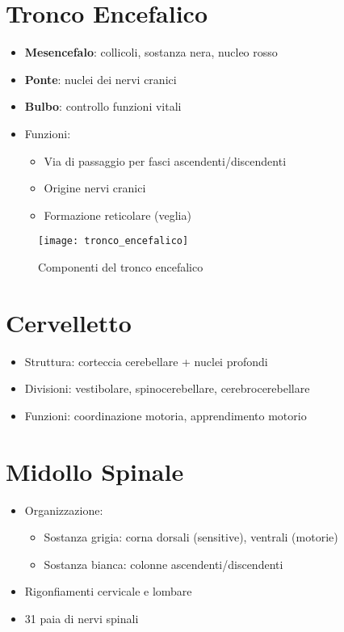 \documentclass[12pt]{article}
\begin{document}
\section{Tronco Encefalico}
\begin{itemize}
    \item \textbf{Mesencefalo}: collicoli, sostanza nera, nucleo rosso
    \item \textbf{Ponte}: nuclei dei nervi cranici
    \item \textbf{Bulbo}: controllo funzioni vitali
    \item Funzioni: 
    \begin{itemize}
        \item Via di passaggio per fasci ascendenti/discendenti
        \item Origine nervi cranici
        \item Formazione reticolare (veglia)
    \end{itemize}
\end{itemize}

\begin{figure}[h]
    \centering
    \texttt{[image: tronco\_encefalico]}
    \caption{Componenti del tronco encefalico}
\end{figure}

\section{Cervelletto}
\begin{itemize}
    \item Struttura: corteccia cerebellare + nuclei profondi
    \item Divisioni: vestibolare, spinocerebellare, cerebrocerebellare
    \item Funzioni: coordinazione motoria, apprendimento motorio
\end{itemize}

\section{Midollo Spinale}
\begin{itemize}
    \item Organizzazione:
    \begin{itemize}
        \item Sostanza grigia: corna dorsali (sensitive), ventrali (motorie)
        \item Sostanza bianca: colonne ascendenti/discendenti
    \end{itemize}
    \item Rigonfiamenti cervicale e lombare
    \item 31 paia di nervi spinali
\end{itemize}
\end{document}
